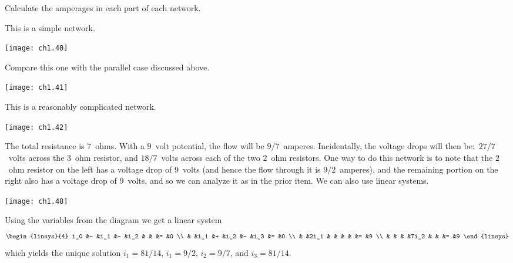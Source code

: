\begin{exercises}
  \item 
    Calculate the amperages in each part of each network.
    \begin{exparts}
      \partsitem This is a simple network.
          \begin{center}
             \texttt{[image: ch1.40]}
        \end{center}
      \partsitem Compare this one with the parallel case discussed above.
          \begin{center}
             \texttt{[image: ch1.41]}
        \end{center}
      \partsitem This is a reasonably complicated network.
          \begin{center}
           \texttt{[image: ch1.42]}
        \end{center}
    \end{exparts}
    \begin{answer}
      \begin{exparts}
        \partsitem The total resistance is $7$~ohms.
          With a $9$~volt potential, the flow will be $9/7$~amperes.
          Incidentally, the voltage drops will then be:~$27/7$~volts
          across the $3$~ohm resistor, and $18/7$~volts across each of
          the two $2$~ohm resistors.        
        \partsitem One way to do this network is to note that the $2$~ohm
          resistor on the left has a voltage drop of $9$~volts
          (and hence the flow through it is $9/2$~amperes), and the 
          remaining portion on the right also has a voltage drop of 
          $9$~volts, and so we can analyze it as in the prior item.
          We can also use linear systems.
          \begin{center}
            \texttt{[image: ch1.48]}
          \end{center}
          Using the variables from the diagram we get a linear system
          \begin{equation*}
            \begin{linsys}{4}
              i_0  &- &i_1  &- &i_2  &  &    &= &0  \\
                   &  &i_1  &+ &i_2  &- &i_3 &= &0  \\
                   &  &2i_1 &  &     &  &    &= &9  \\  
                   &  &     &  &7i_2 &  &    &= &9       
            \end{linsys}
          \end{equation*}
          which yields the unique solution $i_1=81/14$, $i_1=9/2$, $i_2=9/7$,
          and $i_3=81/14$.


\end{exparts}
\end{answer}
\end{exercises}
